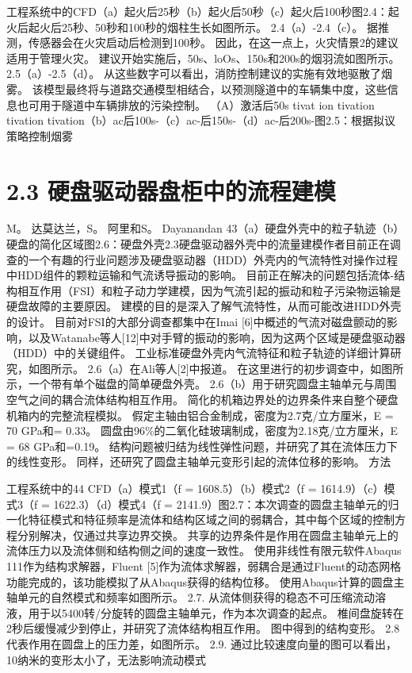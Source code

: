 \documentclass[UTF8,11pt,a4paper,openany,fontset=fandol]{ctexbook}
\begin{document}
工程系统中的CFD（a）起火后25秒（b）起火后50秒（c）起火后100秒图2.4：起火后起火后25秒、50秒和100秒的烟柱生长如图所示。 2.4（a）-2.4（c）。 据推测，传感器会在火灾启动后检测到100秒。 因此，在这一点上，火灾情景2的建议适用于管理火灾。 建议开始实施后，50s、loOs、150s和200s的烟羽流如图所示。 2.5（a）-2.5（d）。 从这些数字可以看出，消防控制建议的实施有效地驱散了烟雾。 该模型最终将与道路交通模型相结合，以预测隧道中的车辆集中度，这些信息也可用于隧道中车辆排放的污染控制。 （A）激活后50s tivat ion tivation tivation tivation（b）ac后100s-（c）ac-后150s-（d）ac-后200s-图2.5：根据拟议策略控制烟雾

\section{2.3 硬盘驱动器盘柜中的流程建模}
M。 达莫达兰，S。 阿里和S。 Dayanandan 43（a）硬盘外壳中的粒子轨迹（b）硬盘的简化区域图2.6：硬盘外壳2.3硬盘驱动器外壳中的流量建模作者目前正在调查的一个有趣的行业问题涉及硬盘驱动器（HDD）外壳内的气流特性对操作过程中HDD组件的颗粒运输和气流诱导振动的影响。 目前正在解决的问题包括流体-结构相互作用（FSI）和粒子动力学建模，因为气流引起的振动和粒子污染物运输是硬盘故障的主要原因。 建模的目的是深入了解气流特性，从而可能改进HDD外壳的设计。 目前对FSI的大部分调查都集中在Imai [6]中概述的气流对磁盘颤动的影响，以及Watanabe等人[12]中对手臂的振动的影响，因为这两个区域是硬盘驱动器（HDD）中的关键组件。 工业标准硬盘外壳内气流特征和粒子轨迹的详细计算研究，如图所示。 2.6（a）在Ali等人[2]中报道。 在这里进行的初步调查中，如图所示，一个带有单个磁盘的简单硬盘外壳。 2.6（b）用于研究圆盘主轴单元与周围空气之间的耦合流体结构相互作用。 简化的机箱边界处的边界条件来自整个硬盘机箱内的完整流程模拟。 假定主轴由铝合金制成，密度为2.7克/立方厘米，E = 70 GPa和= 0.33。 圆盘由96\%的二氧化硅玻璃制成，密度为2.18克/立方厘米，E = 68 GPa和=0.19。 结构问题被归结为线性弹性问题，并研究了其在流体压力下的线性变形。 同样，还研究了圆盘主轴单元变形引起的流体位移的影响。 方法

工程系统中的44 CFD（a）模式1（f = 1608.5）（b）模式2（f = 1614.9）（c）模式3（f = 1622.3）（d）模式4（f = 2141.9）图2.7：本次调查的圆盘主轴单元的归一化特征模式和特征频率是流体和结构区域之间的弱耦合，其中每个区域的控制方程分别解决，仅通过共享边界交换。 共享的边界条件是作用在圆盘主轴单元上的流体压力以及流体侧和结构侧之间的速度一致性。 使用非线性有限元软件Abaqus 111作为结构求解器，Fluent [5]作为流体求解器，弱耦合是通过Fluent的动态网格功能完成的，该功能模拟了从Abaqus获得的结构位移。 使用Abaqus计算的圆盘主轴单元的自然模式和频率如图所示。 2.7. 从流体侧获得的稳态不可压缩流动溶液，用于以5400转/分旋转的圆盘主轴单元，作为本次调查的起点。 椎间盘旋转在2秒后缓慢减少到停止，并研究了流体结构相互作用。 图中得到的结构变形。 2.8代表作用在圆盘上的压力差，如图所示。 2.9. 通过比较速度向量的图可以看出，10纳米的变形太小了，无法影响流动模式
\end{document}
